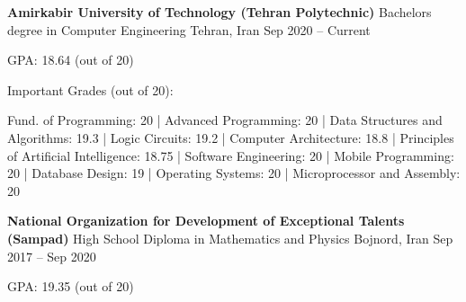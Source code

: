 \documentclass[]{awesome-cv}
\begin{document}
\begin{cventries}
	\cventry
	{\textbf{Amirkabir University of Technology (Tehran Polytechnic)}}
	{Bachelor\textquotesingle{}s degree in Computer Engineering}
	{Tehran, Iran}
	{Sep 2020 – Current}
	{\begin{cvitems}
		\vspace{1mm}
		\item[] {\hspace{-9mm} GPA: 18.64 (out of 20)}
		\vspace{1mm}
		\item[] {\hspace{-9mm} Important Grades (out of 20):}
		\vspace{1mm}
		\item {Fund. of Programming: 20 | Advanced Programming: 20 | Data Structures and Algorithms: 19.3 | 
		Logic Circuits: 19.2 | Computer Architecture: 18.8 | Principles of Artificial Intelligence: 18.75 | 
		Software Engineering: 20 | Mobile Programming: 20 | Database Design: 19 | Operating Systems: 20 | 
		Microprocessor and Assembly: 20}
	\end{cvitems}}
	\cventry
	{\textbf{National Organization for Development of Exceptional Talents (Sampad)}}
	{High School Diploma in Mathematics and Physics}
	{Bojnord, Iran}
	{Sep 2017 – Sep 2020}
	{\begin{cvitems}
		\vspace{1mm}
		\item[] {\hspace{-9mm} GPA: 19.35 (out of 20)}
	\end{cvitems}}
\end{cventries}
\end{document}
